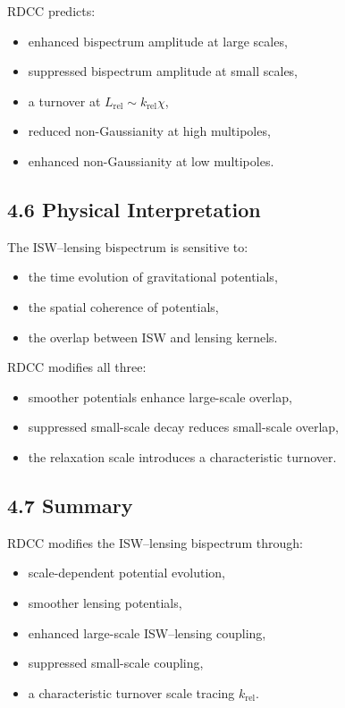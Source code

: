 \documentclass[11pt,a4paper]{article}
\begin{document}
RDCC predicts:

\begin{itemize}
    \item enhanced bispectrum amplitude at large scales,
    \item suppressed bispectrum amplitude at small scales,
    \item a turnover at $L_{\mathrm{rel}} \sim k_{\mathrm{rel}}\chi$,
    \item reduced non-Gaussianity at high multipoles,
    \item enhanced non-Gaussianity at low multipoles.
\end{itemize}

\subsection*{4.6 Physical Interpretation}

The ISW–lensing bispectrum is sensitive to:

\begin{itemize}
    \item the time evolution of gravitational potentials,
    \item the spatial coherence of potentials,
    \item the overlap between ISW and lensing kernels.
\end{itemize}

RDCC modifies all three:

\begin{itemize}
    \item smoother potentials enhance large-scale overlap,
    \item suppressed small-scale decay reduces small-scale overlap,
    \item the relaxation scale introduces a characteristic turnover.
\end{itemize}

\subsection*{4.7 Summary}

RDCC modifies the ISW–lensing bispectrum through:

\begin{itemize}
    \item scale-dependent potential evolution,
    \item smoother lensing potentials,
    \item enhanced large-scale ISW–lensing coupling,
    \item suppressed small-scale coupling,
    \item a characteristic turnover scale tracing $k_{\mathrm{rel}}$.
\end{itemize}
\end{document}
